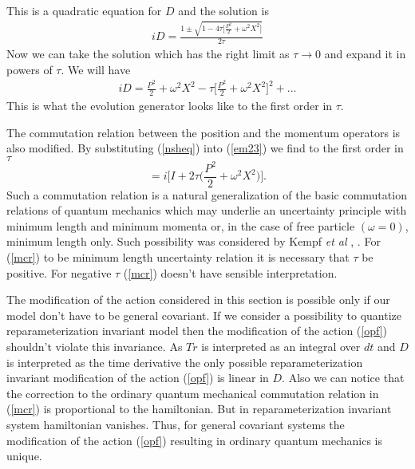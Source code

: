 \documentclass[a4paper,11pt]{article}
\begin{document}
This is a quadratic equation for $D$ and the solution is
\begin{eqnarray}
iD=\frac{1 \pm \sqrt{1-4\tau \Big[ \frac{P^2}{2}+\omega^2
X^2\Big]}}{2 \tau}
\end{eqnarray}
Now we can take the solution which has the right limit as $\tau
\rightarrow 0$ and expand it in powers of $\tau$. We will have
\begin{eqnarray}
iD= \frac{P^2}{2}+\omega^2 X^2 -\tau \Big[ \frac{P^2}{2}+\omega^2
X^2\Big]^2 + ... \label{nsheq}
\end{eqnarray}
This is what the evolution generator looks like to the first order
in $\tau$.

The commutation relation between the position and the momentum
operators is also modified. By substituting (\ref{nsheq}) into
(\ref{em23}) we find to the first order in $\tau$
\begin{equation}
[P,X]=i\bigg[I+2\tau \Big( \frac{P^2}{2}+\omega^2 X^2\Big)\bigg].
\label{mcr}
\end{equation}
Such a commutation relation is a natural generalization of the
basic commutation relations of quantum mechanics which may
underlie an uncertainty principle with minimum length and minimum
momenta or, in the case of free particle $(\omega=0)$, minimum
length only. Such possibility was considered by Kempf {\it et al}
\cite{Kempf95}, \cite{Kempf97}. For (\ref{mcr}) to be minimum
length uncertainty relation it is necessary that $\tau$ be
positive. For negative $\tau$ (\ref{mcr}) doesn't have sensible
interpretation.

The modification of the action considered in this section is
possible only if our model don't have to be general covariant. If
we consider a possibility to quantize reparameterization invariant
model then the modification of the action  (\ref{opf}) shouldn't
violate this invariance. As $Tr$ is interpreted as an integral
over $dt$ and $D$ is interpreted as the time derivative the only
possible reparameterization invariant modification of the action
(\ref{opf}) is linear in $D$. Also we can notice that the
correction to the ordinary quantum mechanical commutation relation
in (\ref{mcr}) is proportional to the hamiltonian. But in
reparameterization invariant system hamiltonian vanishes. Thus,
for general covariant systems the modification of the action
(\ref{opf}) resulting in ordinary quantum mechanics is unique.
\end{document}
